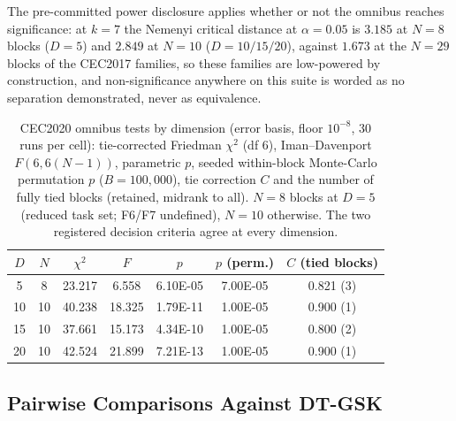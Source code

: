 \documentclass[algorithms,article,submit,moreauthors,pdftex]{Definitions/mdpi}
\newcommand{\dtgsk}{DT-GSK}
\newcommand{\zebra}{}
\begin{document}
The pre-committed power disclosure applies whether or not the omnibus
reaches significance: at $k = 7$ the Nemenyi critical distance at
$\alpha = 0.05$ is $3.185$ at $N = 8$ blocks ($D = 5$) and $2.849$ at
$N = 10$ ($D = 10/15/20$), against $1.673$ at the $N = 29$ blocks of the
CEC2017 families, so these families are low-powered by construction, and
non-significance anywhere on this suite is worded as no separation
demonstrated, never as equivalence.

\begin{table}[H]
\caption{CEC2020 omnibus tests by dimension (error basis, floor
$10^{-8}$, 30 runs per cell): tie-corrected Friedman $\chi^{2}$ (df 6),
Iman--Davenport $F(6, 6(N-1))$, parametric $p$, seeded within-block
Monte-Carlo permutation $p$ ($B = 100{,}000$), tie correction $C$ and the
number of fully tied blocks (retained, midrank to all).  $N = 8$ blocks
at $D = 5$ (reduced task set; F6/F7 undefined), $N = 10$ otherwise.  The
two registered decision criteria agree at every dimension.
}\label{tab:supp:cec2020:omnibus}
\centering
\tablesize{\footnotesize}
\zebra
\begin{tabular}{ccccccc}
\toprule
\textbf{$D$} & \textbf{$N$} & \textbf{$\chi^{2}$} & \textbf{$F$} &
\textbf{$p$} & \textbf{$p$ (perm.)} & \textbf{$C$ (tied blocks)} \\
\midrule
5 & 8 & 23.217 & 6.558 & 6.10E-05 & 7.00E-05 & 0.821 (3) \\
10 & 10 & 40.238 & 18.325 & 1.79E-11 & 1.00E-05 & 0.900 (1) \\
15 & 10 & 37.661 & 15.173 & 4.34E-10 & 1.00E-05 & 0.800 (2) \\
20 & 10 & 42.524 & 21.899 & 7.21E-13 & 1.00E-05 & 0.900 (1) \\
\bottomrule
\end{tabular}
\end{table}

\subsection{Pairwise Comparisons Against \dtgsk{}}\label{sec:supp:cec2020:pairwise}
\end{document}
